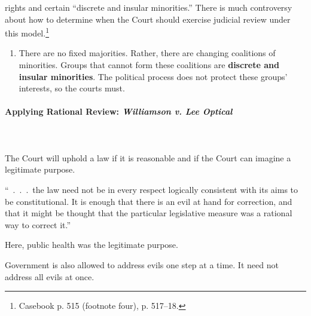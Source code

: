 \begin{enumerate}
    rights and certain ``discrete and insular minorities.'' There is much 
    controversy about how to determine when the Court should exercise judicial 
    review under this model.\footnote{Casebook p. 515 (footnote four), p.  
    517--18.}
    \begin{enumerate}
        \item There are no fixed majorities. Rather, there are changing 
        coalitions of minorities. Groups that cannot form these coalitions are 
        \textbf{discrete and insular minorities}. The political process does 
        not protect these groups' interests, so the courts must.
    \end{enumerate}
\end{enumerate}

\paragraph{Applying Rational Review: \emph{Williamson v. Lee Optical}}
~\\\\
The Court will uphold a law if it is reasonable and if the Court can imagine a 
legitimate purpose.

``~.~.~.~the law need not be in every respect logically consistent with its 
aims to be constitutional. It is enough that there is an evil at hand for 
correction, and that it might be thought that the particular legislative 
measure was a rational way to correct it.''

Here, public health was the legitimate purpose.

Government is also allowed to address evils one step at a time. It need not 
address all evils at once.

